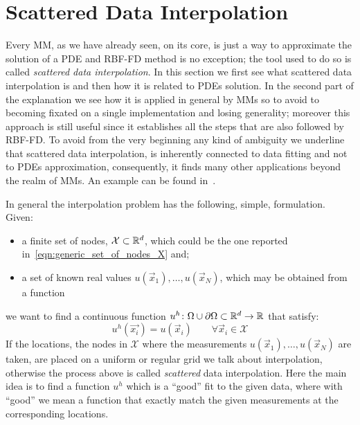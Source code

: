 
\section{Scattered Data Interpolation}
\label{sec:scattered_data_interpolation}

Every MM, as we have already seen, on its core, is just a way to approximate the solution of a PDE and RBF-FD method is no exception; the tool used to do so is called \emph{scattered data interpolation}. In this section we first see what scattered data interpolation is and then how it is related to PDEs solution. In the second part of the explanation we see how it is applied in general by MMs so to avoid to becoming fixated on a single implementation and losing generality; moreover this approach is still useful since it establishes all the steps that are also followed by RBF-FD.
To avoid from the very beginning any kind of ambiguity we underline that scattered data interpolation, is inherently connected to data fitting and not to PDEs approximation, consequently, it finds many other applications beyond the realm of MMs. An example can be found in~\cite{Amidror:scattered_data_interpolation_in_image_processing}.

In general the interpolation problem has the following, simple, formulation. Given:
\begin{itemize}
	\item a finite set of nodes,  $\mathcal{X} \subset \mathbb{R}^d$, which could be the one reported in~\eqref{eqn:generic_set_of_nodes_X} and;
	\item a set of known real values $u(\vec{x}_1), \dots, u(\vec{x}_N)$, which may be obtained from a function
\end{itemize}
we want to find a continuous function $u^{h} \colon \Omega\cup\partial\Omega\subset\mathbb{R}^{d} \to \mathbb{R}$ that satisfy:
\begin{equation}
	\label{eqn:interpolation_constraints}
	u^{h}(\vec{x_i}) = u(\vec{x}_i) \qquad  \forall \vec{x}_i \in \mathcal{X}
\end{equation}
If the locations, the nodes in $\mathcal{X}$ where the measurements $u(\vec{x}_1), \dots, u(\vec{x}_N)$ are taken, are placed on a uniform or regular grid we talk about interpolation, otherwise the process above is called \emph{scattered} data interpolation. Here the main idea is to find a function $u^h$ which is a ``good''  fit to the given data, where with ``good'' we mean a function that exactly match the given measurements at the corresponding locations.


